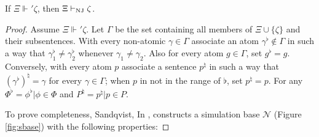 \documentclass{lipics-v2021}
\newcommand{\supp}[1]{\Vdash_{#1}}
\newcommand{\arenasupp}[1]{\Vdash_{#1}'}  %
\newcommand{\sbase}{\mathcal{N}}                       %
\newcommand{\shrp}[1]{#1^{\natural}}                          %
\newcommand{\flatset}[1]{#1^{\flat}}                    %
\newcommand{\shrpset}[1]{#1^{\natural}}                       %
\newcommand{\IPL}{\textsf{IPL}}
\begin{document}
\begin{theorem}[Completeness] \label{thm:completeness} 
If $\Xi \arenasupp{} \zeta$, then $\Xi \vdash_{\rm NJ} \zeta$. %
\end{theorem}
\begin{proof}
Assume $\Xi \arenasupp{} \zeta$. Let $\Gamma$ be the set containing all members of $\Xi \cup \{\zeta\}$ and their subsentences. With every non-atomic $\gamma \in \Gamma$ associate an atom $\gamma^\flat \notin \Gamma$ in such a way that $\gamma_{1}^\flat \neq \gamma^\flat_2$ whenever $\gamma_1 \neq \gamma_2$. Also for every atom $g \in \Gamma$, set $g^\flat = g$. Conversely, with every atom $p$ associate a sentence $\shrp{p}$ in such a way that $\shrp{(\gamma^\flat)} = \gamma$ for every $\gamma  \in \Gamma$; when $p$ in not in the range of $\flat$, set $\shrp{p} = p$. For any $\flatset{\Phi} = {\phi^\flat | \phi \in \Phi}$ and $\shrpset{P} = {\shrp{p} | p \in P}$.

To prove completeness, Sandqvist, In \cite{Sandqvist_Tor}, constructs a simulation base $\sbase$ (Figure \ref{fig:sbase}) with the following properties:


\end{proof}
\end{document}
